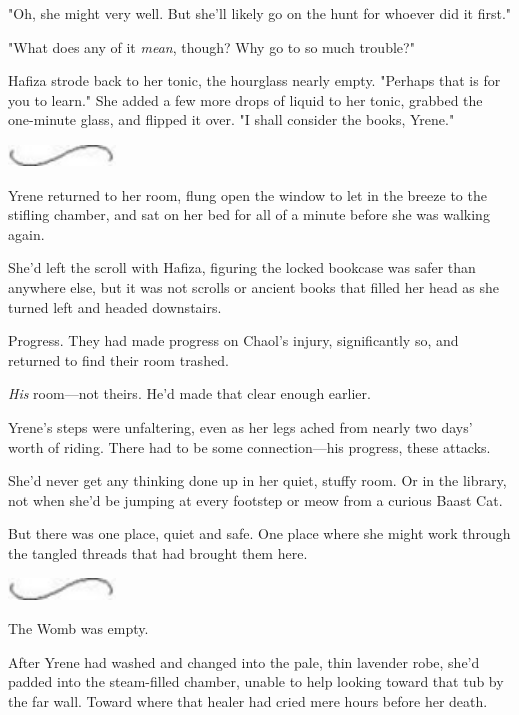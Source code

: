 "Oh, she might very well. But she'll likely go on the hunt for whoever did it first."

"What does any of it \emph{mean}, though? Why go to so much trouble?"

Hafiza strode back to her tonic, the hourglass nearly empty. "Perhaps that is for you to learn." She added a few more drops of liquid to her tonic, grabbed the one-minute glass, and flipped it over. "I shall consider the books, Yrene."

\includegraphics[width=1.12in,height=0.24in]{images/seperator}

Yrene returned to her room, flung open the window to let in the breeze to the stifling chamber, and sat on her bed for all of a minute before she was walking again.

She'd left the scroll with Hafiza, figuring the locked bookcase was safer than anywhere else, but it was not scrolls or ancient books that filled her head as she turned left and headed downstairs.

Progress. They had made progress on Chaol's injury, significantly so, and returned to find their room trashed.

\emph{His} room---not theirs. He'd made that clear enough earlier.

Yrene's steps were unfaltering, even as her legs ached from nearly two days' worth of riding. There had to be some connection---his progress, these attacks.

She'd never get any thinking done up in her quiet, stuffy room. Or in the library, not when she'd be jumping at every footstep or meow from a curious Baast Cat.

But there was one place, quiet and safe. One place where she might work through the tangled threads that had brought them here.

\includegraphics[width=1.12in,height=0.24in]{images/seperator}

The Womb was empty.

After Yrene had washed and changed into the pale, thin lavender robe, she'd padded into the steam-filled chamber, unable to help looking toward that tub by the far wall. Toward where that healer had cried mere hours before her death.

